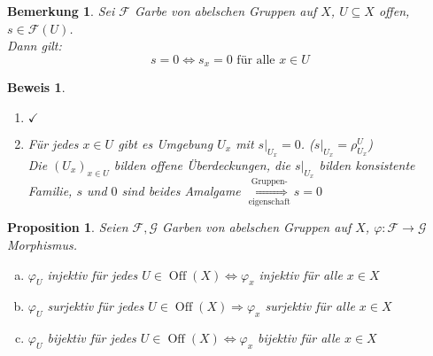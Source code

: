 \documentclass[a4paper,12pt]{report}
\theoremstyle{break}
\newtheorem{Bem}[Def]{Bemerkung}
\newtheorem{Prop}[Def]{Proposition}
\theoremstyle{nonumberbreak}
\newtheorem{bew}{Beweis}
\theoremstyle{nonumberplain}
\newcommand{\quot}[1]{\textrm{\glqq}{#1}\textrm{\grqq}}
\newenvironment{twosidedproof}{\begin{enumerate}[\quot{$\Rightarrow$}:]}{\end{enumerate}}
\newcommand{\proofforward}{\item[\quot{$\Rightarrow$}:]}
\newcommand{\proofreverse}{\item[\quot{$\Leftarrow$}:]}
\DeclareMathOperator{\Off}{Off}
\newcommand{\calF}{\mathcal{F}}
\newcommand{\calG}{\mathcal{G}}
\begin{document}

\begin{Bem}\label{1.7}
Sei $\calF$ Garbe von abelschen Gruppen auf $X$, $U\subseteq X$ offen, $s\in \calF(U)$.\\
Dann gilt:
  \[s=0 \Leftrightarrow s_x = 0 \text{ f\"ur alle } x\in U\]
\end{Bem}

\begin{bew}\begin{twosidedproof}
\proofforward
  $\checkmark$
\proofreverse
  F\"ur jedes $x\in U$ gibt es Umgebung $U_x$ mit $s|_{U_x} = 0$. ($s|_{U_x} = \rho_{U_x}^U$)\\
  Die $(U_x)_{x\in U}$ bilden offene \"Uberdeckungen, die $s|_{U_x}$ bilden konsistente Familie, $s$ und $0$ sind beides Amalgame $\overset{\text{Gruppen-}}{\underset{\text{eigenschaft}}{\Longrightarrow}} s= 0$
\end{twosidedproof}\end{bew}

\begin{Prop}\label{1.8}
Seien $\calF, \calG$ Garben von abelschen Gruppen auf $X$, $\varphi: \calF \to \calG$ Morphismus.
\begin{enumerate}[a)]
\item\label{1.8a}
  $\varphi_U$ injektiv f\"ur jedes $U\in \Off(X) \Leftrightarrow \varphi_x$ injektiv f\"ur alle $x\in X$
\item
  $\varphi_U$ surjektiv f\"ur jedes $U\in \Off(X) \Rightarrow \varphi_x$ surjektiv f\"ur alle $x\in X$
\item
  $\varphi_U$ bijektiv f\"ur jedes $U\in \Off(X) \Leftrightarrow \varphi_x$ bijektiv f\"ur alle $x\in X$
\end{enumerate}\end{Prop}
\end{document}
